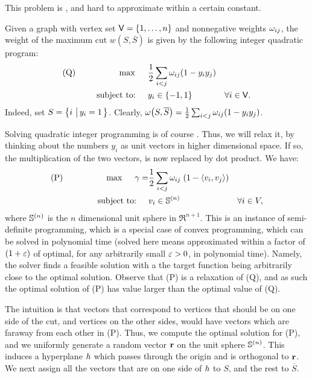 This problem is \NPComplete, and hard to approximate within a certain
constant.




Given a graph with vertex set $\mathsf{V} = \left\{ {1,\ldots, n} \right\}$ and
nonnegative weights $\omega_{ij}$, the weight of the maximum cut
$w(S, \overline{S})$ is given by the following integer quadratic
program:
\begin{align*}
  \text{(Q)~~~~~~~~~~~~~~~} \max \text{~~~ }
  & \frac{1}{2}\sum_{i < j} \omega_{ij}(1 - y_i y_j )\\
  \text{ subject to: ~~~} & y_i \in \left\{ {-1,1} \right\} & \forall i \in
                                                 \mathsf{V}.
\end{align*}
Indeed, set $S = \left\{ { i \,\left|\, { y_i = 1 } \bigr.\right. } \right\}$. Clearly,
$\WeightX{S, \smash{\overline{S}} \bigr.} = \frac{1}{2}\sum_{i < j}
\WeightChar_{ij}(1 - y_i y_j )$.

Solving quadratic integer programming is of course \NPHard. Thus, we
will relax it, by thinking about the numbers $y_i$ as unit vectors in
higher dimensional space. If so, the multiplication of the two
vectors, is now replaced by dot product. We have:
\begin{align*}
  \text{(P)~~~~~~~~~~~~~~~} \max \text{~~~ } \gamma = & \frac{1}{2}\sum_{i <
                                                        j} \WeightChar_{ij} \;\pth{1
                                                        - \DotProd{v_i}{v_j} }\\
  \text{ ~subject to: ~~~} & v_i \in \Sphere{n} & \forall i \in V,
\end{align*}
where ${\mathbb{S}^{(n)}}$ is the $n$ dimensional unit sphere in $\Re^{n+1}$.
This is an instance of semi-definite programming, which is a special
case of convex programming, which can be solved in polynomial time
(solved here means approximated within a factor of $(1+{\varepsilon})$ of
optimal, for any arbitrarily small ${\varepsilon} > 0$, in polynomial
time). Namely, the solver finds a feasible solution with a the target
function being arbitrarily close to the optimal solution.  Observe
that (P) is a relaxation of (Q), and as such the optimal solution of
(P) has value larger than the optimal value of (Q).

The intuition is that vectors that correspond to vertices that should
be on one side of the cut, and vertices on the other sides, would have
vectors which are faraway from each other in (P). Thus, we compute the
optimal solution for (P), and we uniformly generate a random vector
$\mathbf{r}$ on the unit sphere ${\mathbb{S}^{(n)}}$. This induces a hyperplane
$h$ which passes through the origin and is orthogonal to
$\mathbf{r}$. We next assign all the vectors that are on one side of
$h$ to $S$, and the rest to $\overline{S}$.

